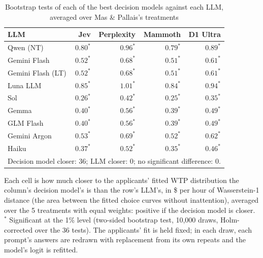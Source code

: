\begin{table}[htbp]
\centering
\caption{Bootstrap tests of each of the best decision models against each LLM, averaged over Mas \& Pallais's treatments}
\label{tab:mas_pallais_bootstrap_best}
\begin{tabular}{lrrrr}
\toprule
LLM & Jev & Perplexity & Mammoth & D1 Ultra \\
\midrule
Qwen (NT) & $0.80^{*}$ & $0.96^{*}$ & $0.79^{*}$ & $0.89^{*}$ \\
Gemini Flash & $0.52^{*}$ & $0.68^{*}$ & $0.51^{*}$ & $0.61^{*}$ \\
Gemini Flash (LT) & $0.52^{*}$ & $0.68^{*}$ & $0.51^{*}$ & $0.61^{*}$ \\
Luna LLM & $0.85^{*}$ & $1.01^{*}$ & $0.84^{*}$ & $0.94^{*}$ \\
Sol & $0.26^{*}$ & $0.42^{*}$ & $0.25^{*}$ & $0.35^{*}$ \\
Gemma & $0.40^{*}$ & $0.56^{*}$ & $0.39^{*}$ & $0.49^{*}$ \\
GLM Flash & $0.40^{*}$ & $0.56^{*}$ & $0.39^{*}$ & $0.49^{*}$ \\
Gemini Argon & $0.53^{*}$ & $0.69^{*}$ & $0.52^{*}$ & $0.62^{*}$ \\
Haiku & $0.37^{*}$ & $0.52^{*}$ & $0.35^{*}$ & $0.46^{*}$ \\
\midrule
\multicolumn{5}{l}{\footnotesize Decision model closer: 36; LLM closer: 0; no significant difference: 0.} \\
\bottomrule
\end{tabular}
\par\smallskip
\parbox{\linewidth}{\footnotesize Each cell is how much closer to the applicants' fitted WTP distribution the column's decision model's is than the row's LLM's, in \$ per hour of Wasserstein-1 distance (the area between the fitted choice curves without inattention), averaged over the 5 treatments with equal weights: positive if the decision model is closer. $^{*}$ Significant at the 1\% level (two-sided bootstrap test, 10,000 draws, Holm-corrected over the 36 tests). The applicants' fit is held fixed; in each draw, each prompt's answers are redrawn with replacement from its own repeats and the model's logit is refitted.}
\end{table}
